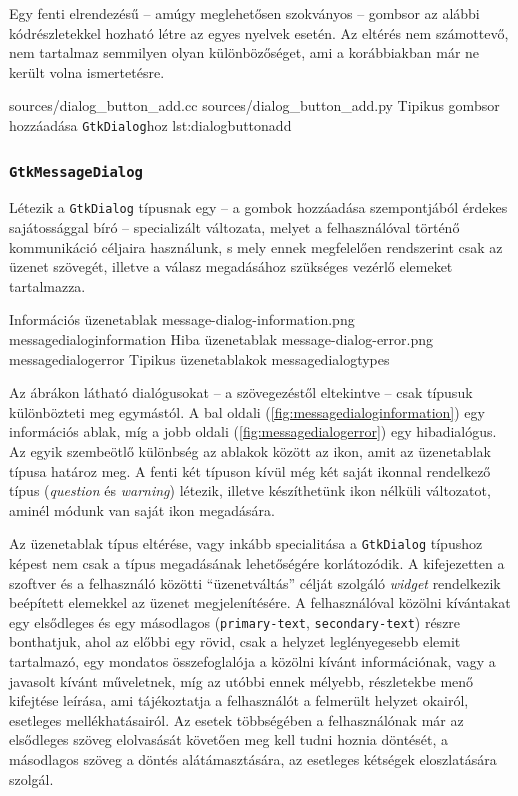 Egy fenti elrendezésű -- amúgy meglehetősen szokványos -- gombsor az alábbi kódrészletekkel hozható létre az egyes nyelvek esetén. Az eltérés nem számottevő, nem tartalmaz semmilyen olyan különbözőséget, ami a korábbiakban már ne került volna ismertetésre.

{sources/dialog_button_add.cc}
{sources/dialog_button_add.py}
{Tipikus gombsor hozzáadása \texttt{GtkDialog}hoz\cite{gnomehig}}
{lst:dialogbuttonadd}

\subsubsection{\texttt{GtkMessageDialog}}
\label{sec:messagedialog}

Létezik a \texttt{GtkDialog} típusnak egy -- a gombok hozzáadása szempontjából érdekes sajátossággal bíró -- specializált változata, melyet a felhasználóval történő kommunikáció céljaira használunk, s mely ennek megfelelően rendszerint csak az üzenet szövegét, illetve a válasz megadásához szükséges vezérlő elemeket tartalmazza.

{Információs üzenetablak}
{message-dialog-information.png}
{messagedialoginformation}
{Hiba üzenetablak}
{message-dialog-error.png}
{messagedialogerror}
{Tipikus üzenetablakok}
{messagedialogtypes}

Az ábrákon látható dialógusokat -- a szövegezéstől eltekintve -- csak típusuk különbözteti meg egymástól. A bal oldali (\ref{fig:messagedialoginformation}) egy információs ablak, míg a jobb oldali (\ref{fig:messagedialogerror}) egy hibadialógus. Az egyik szembeötlő különbség az ablakok között az ikon, amit az üzenetablak típusa határoz meg. A fenti két típuson kívül még két saját ikonnal rendelkező típus (\textit{question} és \textit{warning}) létezik, illetve készíthetünk ikon nélküli változatot, aminél módunk van saját ikon megadására.

Az üzenetablak típus eltérése, vagy inkább specialitása a \texttt{GtkDialog} típushoz képest nem csak a típus megadásának lehetőségére korlátozódik. A kifejezetten a szoftver és a felhasználó közötti ``üzenetváltás'' célját szolgáló \textit{widget} rendelkezik beépített elemekkel az üzenet megjelenítésére. A felhasználóval közölni kívántakat egy elsődleges és egy másodlagos (\texttt{primary-text}, \texttt{secondary-text}) részre bonthatjuk, ahol az előbbi egy rövid, csak a helyzet leglényegesebb elemit tartalmazó, egy mondatos összefoglalója a közölni kívánt információnak, vagy a javasolt kívánt műveletnek, míg az utóbbi ennek mélyebb, részletekbe menő kifejtése leírása, ami tájékoztatja a felhasználót a felmerült helyzet okairól, esetleges mellékhatásairól. Az esetek többségében a felhasználónak már az elsődleges szöveg elolvasását követően meg kell tudni hoznia döntését, a másodlagos szöveg a döntés alátámasztására, az esetleges kétségek eloszlatására szolgál.

